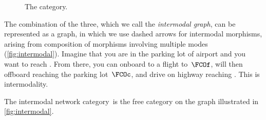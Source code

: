 \begin{example}
    \begin{figure}[h!]
        \centering
        \caption{The \Board category. }
        \label{fig:boarding}
    \end{figure}

    The combination of the three, which we call the \emph{intermodal graph}, can be represented as a graph, in which we use dashed arrows for intermodal morphisms, arising from composition of morphisms involving multiple modes (\cref{fig:intermodal}).
    Imagine that you are in the parking lot of \ZRH airport and you want to reach .
    From there, you can onboard to a  flight to~$\FCOf$, will then offboard reaching the parking lot~$\FCOc$, and drive on highway  reaching .
    This is intermodality.

    \begin{figure*}[h!]
        \centering
        \caption{Intermodal graph.
            The dashed arrows represent intermodal morphisms, and we depict just one of them for simplicity.
        }
        \label{fig:intermodal}
    \end{figure*}
\end{example}

The intermodal network category~\Intermodal is the free category on the graph illustrated in \cref{fig:intermodal}.
